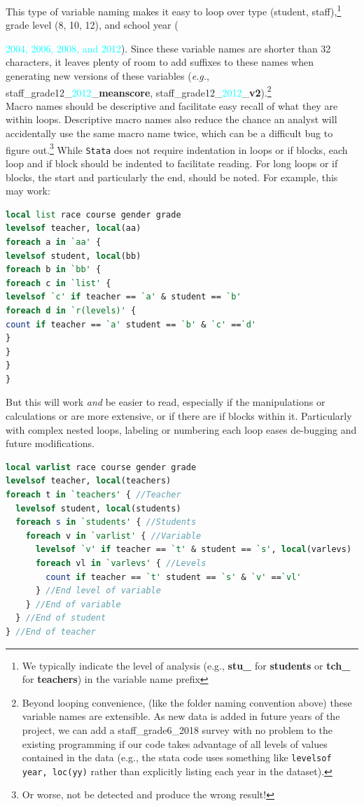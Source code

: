 This type of  variable naming makes it easy to loop over type ({\textcolor{uscred}{student}}, {\textcolor{uscgold}{staff}}),\footnote{We typically indicate the level of analysis (e.g., \textcolor{uscred}{\textbf{stu\_}} for \textcolor{uscred}{\textbf{students}} or \textcolor{uscgold}{\textbf{tch\_}} for \textcolor{uscgold}{\textbf{teachers}}) in the variable name prefix} grade level (8, 10, 12), and school year ({\textcolor{cyan}{2004, 2006, 2008, and 2012}).  Since these variable names are shorter than 32 characters, it leaves plenty of room to add suffixes to these names when generating new versions of these variables (\textit{e.g.}, {\textcolor{uscgold}{\textsf{staff}}}\_grade12\_{\textcolor{cyan}{2012}}\_\textbf{meanscore},  {\textcolor{uscgold}{\textsf{staff}}}\_grade12\_{\textcolor{cyan}{2012}}\_\textbf{v2}).\footnote{Beyond looping convenience, (like the folder naming convention above) these variable names are extensible. As new data is added in future years of the project, we can add a staff\_grade6\_2018 survey with no problem to the existing programming if our code takes advantage of all levels of values contained in the data (e.g., the stata code uses something like \texttt{levelsof year, loc(yy)} rather than explicitly listing each year in the dataset).} \\

Macro names should be descriptive and facilitate easy recall of what they are within loops. Descriptive macro names also reduce the chance an analyst will accidentally use the same macro name twice, which can be a difficult bug to figure out.\footnote{Or worse, not be detected and produce the wrong result!} While \texttt{Stata} does not require indentation in loops or if blocks, each loop and if block should be indented to facilitate reading. For long loops or if blocks, the start and particularly the end, should be noted. For example, this may work:
\begin{lstlisting}[language=Stata, numbers=none]
local list race course gender grade
levelsof teacher, local(aa)
foreach a in `aa' {
levelsof student, local(bb)
foreach b in `bb' {
foreach c in `list' {
levelsof `c' if teacher == `a' & student == `b'
foreach d in `r(levels)' {
count if teacher == `a' student == `b' & `c' ==`d'
}
}
}
}
\end{lstlisting}
But this will work \emph{and} be easier to read, especially if the manipulations or calculations or are more extensive, or if there are if blocks within it. Particularly with complex nested loops, labeling or numbering each loop eases de-bugging and future modifications.
\begin{lstlisting}[language=Stata, numbers=none]
local varlist race course gender grade
levelsof teacher, local(teachers)
foreach t in `teachers' { //Teacher
  levelsof student, local(students)
  foreach s in `students' { //Students
    foreach v in `varlist' { //Variable
      levelsof `v' if teacher == `t' & student == `s', local(varlevs)
      foreach vl in `varlevs' { //Levels
        count if teacher == `t' student == `s' & `v' ==`vl'
      } //End level of variable
    } //End of variable
  } //End of student
} //End of teacher
\end{lstlisting}

}
